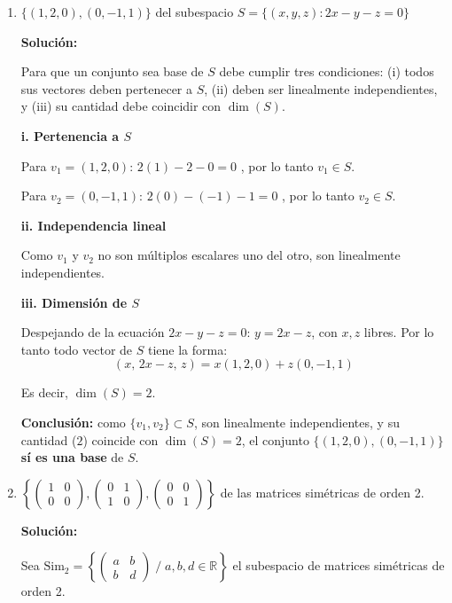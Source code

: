 \documentclass[12pt]{article}
\newcommand{\solucion}{%
    \vspace{0.8em}%
    \textbf{Solución:}%
    \vspace{0.8em}%
}
\begin{document}
\begin{enumerate}[label=\alph*.-]
    \item $\{(1,2,0),(0,-1,1)\}$ del subespacio $S = \{(x,y,z): 2x - y - z = 0\}$

    \solucion

    Para que un conjunto sea base de $S$ debe cumplir tres condiciones: (i) todos sus vectores deben pertenecer a $S$, (ii) deben ser linealmente independientes, y (iii) su cantidad debe coincidir con $\dim(S)$.

    \textbf{i. Pertenencia a $S$}

    Para $v_1=(1,2,0)$: $2(1)-2-0=0$ \checkmark, por lo tanto $v_1\in S$.

    Para $v_2=(0,-1,1)$: $2(0)-(-1)-1=0$ \checkmark, por lo tanto $v_2\in S$.

    \textbf{ii. Independencia lineal}

    Como $v_1$ y $v_2$ no son múltiplos escalares uno del otro, son linealmente independientes.

    \textbf{iii. Dimensión de $S$}

    Despejando de la ecuación $2x-y-z=0$: $y=2x-z$, con $x,z$ libres. Por lo tanto todo vector de $S$ tiene la forma:
    \[
    (x,\,2x-z,\,z) = x(1,2,0)+z(0,-1,1)
    \]

    Es decir, $\dim(S)=2$.

    \textbf{Conclusión:} como $\{v_1,v_2\}\subset S$, son linealmente independientes, y su cantidad ($2$) coincide con $\dim(S)=2$, el conjunto $\{(1,2,0),(0,-1,1)\}$ \textbf{sí es una base} de $S$.

    \item $\left\{ \begin{pmatrix} 1 & 0 \\ 0 & 0 \end{pmatrix}, \begin{pmatrix} 0 & 1 \\ 1 & 0 \end{pmatrix}, \begin{pmatrix} 0 & 0 \\ 0 & 1 \end{pmatrix} \right\}$ de las matrices simétricas de orden 2.

    \solucion

    Sea $\text{Sim}_2 = \left\{ \begin{pmatrix}a&b\\b&d\end{pmatrix} \; / \; a,b,d\in\mathbb{R} \right\}$ el subespacio de matrices simétricas de orden 2.


\end{enumerate}
\end{document}

